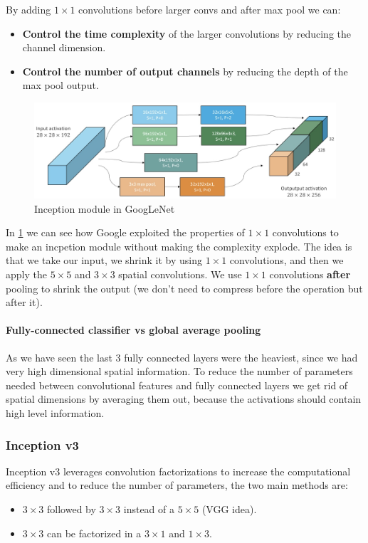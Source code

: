 By adding $1\times 1$ convolutions before larger convs and after max pool we can:
\begin{itemize}
  \item \textbf{Control the time complexity} of the larger convolutions by reducing the channel dimension.
  \item \textbf{Control the number of output channels} by reducing the depth of the max pool output.
\end{itemize}

\begin{figure}[htbp]
  \centering
  \includegraphics[width=0.8\linewidth]{./img/inception.jpg}
  \caption{Inception module in GoogLeNet}
  \label{fig:inception}
\end{figure}

In \ref{fig:inception} we can see how Google exploited the properties of $1\times 1$ convolutions to make an incpetion module without making the complexity explode.
The idea is that we take our input, we shrink it by using $1\times 1$ convolutions, and then we apply the $5 \times 5$ and $3 \times 3$ spatial convolutions.
We use $1\times 1$ convolutions \textbf{after} pooling to shrink the output (we don't need to compress before the operation but after it).

\paragraph{Fully-connected classifier vs global average pooling}
As we have seen the last 3 fully connected layers were the heaviest, since we had very high dimensional spatial information.
To reduce the number of parameters needed between convolutional features and fully connected layers we get rid of spatial dimensions by averaging them out, because the activations should contain high level information.

\subsubsection{Inception v3}
Inception v3 leverages convolution factorizations to increase the computational efficiency and to reduce the number of parameters, the two main methods are:
\begin{itemize}
  \item $3 \times 3$ followed by $3 \times 3$ instead of a $5 \times 5$ (VGG idea).
  \item $3 \times 3$ can be factorized in a $3\times 1$ and $1 \times 3$.
\end{itemize}

